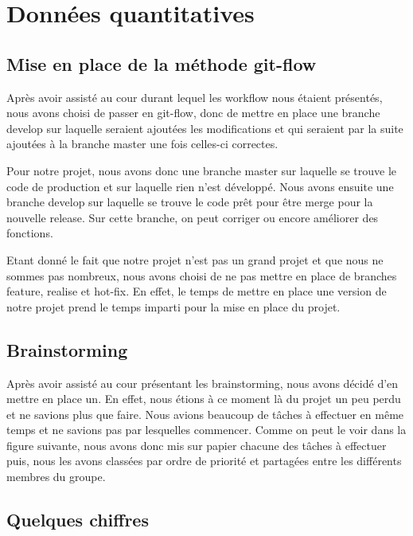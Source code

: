 \documentclass{report}
\begin{document}
\chapter{Données quantitatives}
\section{Mise en place de la méthode git-flow}
\hspace{0.5cm}Après avoir assisté au cour durant lequel les workflow nous étaient présentés, nous avons choisi de passer en git-flow, donc de mettre en place une branche develop sur laquelle seraient ajoutées les modifications et qui seraient par la suite ajoutées à la branche master une fois celles-ci correctes.\par
Pour notre projet, nous avons donc une branche master sur laquelle se trouve le code de production et sur laquelle rien n'est développé. Nous avons ensuite une branche develop sur laquelle se trouve le code prêt pour être merge pour la nouvelle release. Sur cette branche, on peut corriger ou encore améliorer des fonctions. \par
Etant donné le fait que notre projet n'est pas un grand projet et que nous ne sommes pas nombreux, nous avons choisi de ne pas mettre en place de branches feature, realise et hot-fix. En effet, le temps de mettre en place une version de notre projet prend le temps imparti pour la mise en place du projet.\par

\section{Brainstorming}
\hspace{0.5cm}Après avoir assisté au cour présentant les brainstorming, nous avons décidé d'en mettre en place un. En effet, nous étions à ce moment là du projet un peu perdu et ne savions plus que faire. Nous avions beaucoup de tâches à effectuer en même temps et ne savions pas par lesquelles commencer. Comme on peut le voir dans la figure suivante, nous avons donc mis sur papier chacune des tâches à effectuer puis, nous les avons classées par ordre de priorité et partagées entre les différents membres du groupe. \par


\section{Quelques chiffres}
\hspace{0.5cm}
\end{document}
